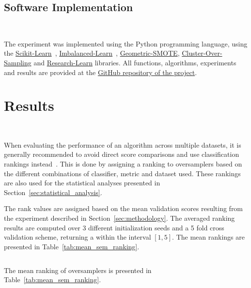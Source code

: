 \documentclass[remotesensing,article,submit,moreauthors,pdftex]{Definitions/mdpi}
\begin{document}
\begin{paracol}{2}
\linenumbers
\switchcolumn

\subsection{Software Implementation}~\label{sec:implementation}

The experiment was implemented using the Python programming language, using the
\href{https://scikit-learn.org/stable/}{Scikit-Learn}~\cite{Pedregosa2011},
\href{https://imbalanced-learn.org/en/stable/}{Imbalanced-Learn}~\cite{JMLR:v18:16-365},
\href{https://geometric-smote.readthedocs.io/en/latest/?badge=latest}{Geometric-SMOTE},
\href{https://cluster-over-sampling.readthedocs.io/en/latest/?badge=latest}{Cluster-Over-Sampling}
and \href{https://research-learn.readthedocs.io/en/latest/?badge=latest}{Research-Learn} libraries.
All functions, algorithms, experiments and results are provided at the
\href{https://github.com/AlgoWit/publications}{GitHub
repository of the project}.

\pagebreak
\section{Results}~\label{sec:results}

When evaluating the performance of an algorithm across multiple datasets, it
is generally recommended to avoid direct score comparisons and use
classification rankings instead~\cite{demvsar2006}. This is done by assigning
a ranking to oversamplers based on the different combinations of classifier,
metric and dataset used. These rankings are also used for the statistical
analyses presented in Section~\ref{sec:statistical_analysis}.

The rank values are assigned based on the mean validation scores resulting
from the experiment described in Section~\ref{sec:methodology}. The averaged
ranking results are computed over 3 different initialization seeds and a 5
fold cross validation scheme, returning a within the interval $[1,5]$. The mean rankings are presented in
Table~\ref{tab:mean_sem_ranking}.

\subsection{}

 The
 mean ranking of
oversamplers is presented in Table~\ref{tab:mean_sem_ranking}. 

\end{paracol}
\end{document}

